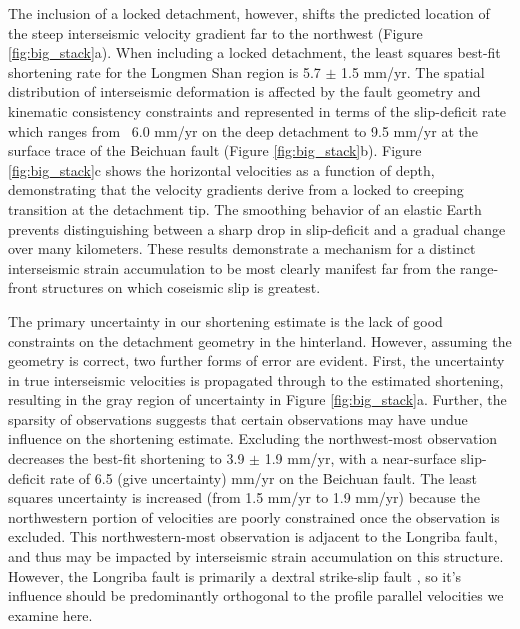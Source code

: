 \documentclass[12pt]{article}
\begin{document}
The inclusion of a locked detachment, however, shifts the predicted location of the steep interseismic velocity gradient far to the northwest (Figure \ref{fig:big_stack}a). When including a locked detachment, the least squares best-fit shortening rate for the Longmen Shan region is 5.7 $\pm$ 1.5 mm/yr. The spatial distribution of interseismic deformation is affected by the fault geometry and kinematic consistency constraints and represented in terms of the slip-deficit rate which ranges from ~6.0 mm/yr on the deep detachment to 9.5 mm/yr at the surface trace of the Beichuan fault (Figure \ref{fig:big_stack}b). Figure \ref{fig:big_stack}c shows the horizontal velocities as a function of depth, demonstrating that the velocity gradients derive from a locked to creeping transition at the detachment tip. The smoothing behavior of an elastic Earth prevents distinguishing between a sharp drop in slip-deficit and a gradual change over many kilometers. These results demonstrate a mechanism for a distinct interseismic strain accumulation to be most clearly manifest far from the range-front structures on which coseismic slip is greatest.

The primary uncertainty in our shortening estimate is the lack of good constraints on the detachment geometry in the hinterland. However, assuming the geometry is correct, two further forms of error are evident. First, the uncertainty in true interseismic velocities is propagated through to the estimated shortening, resulting in the gray region of uncertainty in Figure \ref{fig:big_stack}a. Further, the sparsity of observations suggests that certain observations may have undue influence on the shortening estimate. Excluding the northwest-most observation decreases the best-fit shortening to 3.9 $\pm$ 1.9 mm/yr, with a near-surface slip-deficit rate of 6.5 (give uncertainty) mm/yr on the Beichuan fault. The least squares uncertainty is increased (from 1.5 mm/yr to 1.9 mm/yr) because the northwestern portion of velocities are poorly constrained once the observation is excluded. This northwestern-most observation is adjacent to the Longriba fault, and thus may be impacted by interseismic strain accumulation on this structure. However, the Longriba fault is primarily a dextral strike-slip fault \citep{Ren2013}, so it's influence should be predominantly orthogonal to the profile parallel velocities we examine here.
\end{document}
